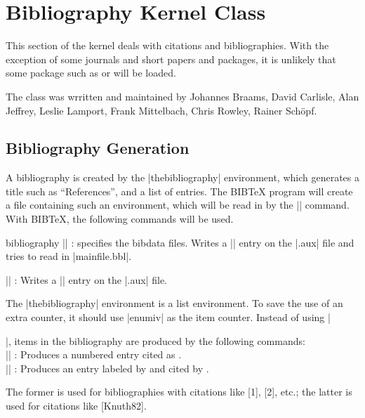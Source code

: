 \chapter{Bibliography Kernel Class}
 \label{kernel:biblio} 
  This section of the kernel deals with citations and bibliographies. With the exception of some journals and
  short papers and packages, it is unlikely that some package such as  or 
  will be loaded.
  
  The class was wrritten and maintained by Johannes Braams,
  David Carlisle,
  Alan Jeffrey,
  Leslie Lamport,
  Frank Mittelbach,
  Chris Rowley,
  Rainer Sch\"opf.



 \section{Bibliography Generation}

  A bibliography is created by the |thebibliography| environment, which
  generates a title such as ``References'', and a list of entries.
  The BIB\TeX{} program will create a file containing such an
  environment, which will be read in by the || command.
  With BIB\TeX, the following commands will be used.

 \begin{docCommand*}{bibliography}{}
  || : specifies
     the bibdata files.  Writes a |\bibdata| entry on the |.aux| file
     and tries to read in |mainfile.bbl|.
\end{docCommand*}

 \DescribeMacro{}
  || :
     Writes a |\bibstyle| entry on the |.aux| file.

  The |thebibliography| environment is a list environment.  To save the
  use of an extra counter, it should use  |enumiv|  as the item
  counter.
  Instead of using |\item|, items in the bibliography are produced by
  the  following commands:\\
    |\bibitem|    : Produces a numbered entry cited as
    .\\
    |\bibitem| : Produces an entry labeled by
     and cited by .

  The former is used for bibliographies with citations like [1], [2],
  etc.;
  the latter is used for citations like [Knuth82].

